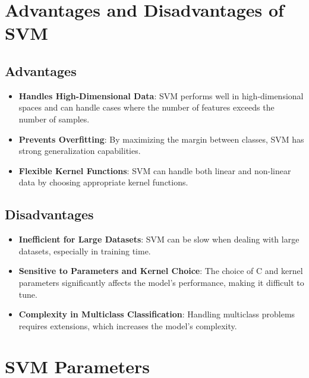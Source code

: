 \documentclass{article}
\begin{document}
	\section{Advantages and Disadvantages of SVM}
	
	\subsection{Advantages}
	
	\begin{itemize}
		\item \textbf{Handles High-Dimensional Data}: SVM performs well in high-dimensional spaces and can handle cases where the number of features exceeds the number of samples.
		\item \textbf{Prevents Overfitting}: By maximizing the margin between classes, SVM has strong generalization capabilities.
		\item \textbf{Flexible Kernel Functions}: SVM can handle both linear and non-linear data by choosing appropriate kernel functions.
	\end{itemize}
	
	\subsection{Disadvantages}
	
	\begin{itemize}
		\item \textbf{Inefficient for Large Datasets}: SVM can be slow when dealing with large datasets, especially in training time.
		\item \textbf{Sensitive to Parameters and Kernel Choice}: The choice of C and kernel parameters significantly affects the model's performance, making it difficult to tune.
		\item \textbf{Complexity in Multiclass Classification}: Handling multiclass problems requires extensions, which increases the model's complexity.
	\end{itemize}
	
	\section{SVM Parameters}
	
	
\end{document}
